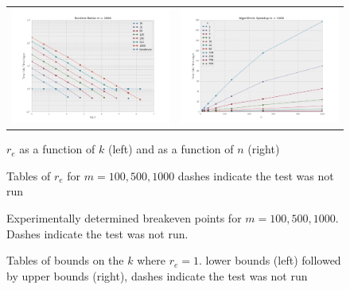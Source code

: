 \begin{figure}
\begin{tabular}{cc}
\includegraphics[width=\plotwidth]{tratio1000.png} & \includegraphics[width=\plotwidth]{tratioarc1000.png}\\
\end{tabular}
\caption{$r_e$ as a function of $k$ (left) and as a function of $n$ (right) }
\label{fig:1000plot}
\end{figure}
\begin{figure}
\centering

\caption{Tables of $r_e$ for $m=100,500,1000$ dashes indicate the test was not run}
\end{figure}

\begin{figure}
\centering

\caption{Experimentally determined breakeven points for $m=100,500,1000$. Dashes indicate the test was not run.}
\end{figure}

\begin{figure}
\centering

\caption{Tables of bounds on the $k$ where $r_e=1$. lower bounds (left) followed by upper bounds (right), dashes indicate the test was not run}
\end{figure}
